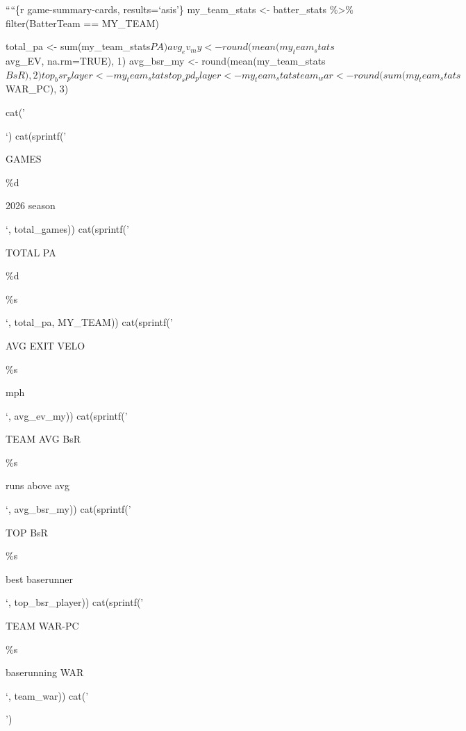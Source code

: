 \documentclass[
]{article}
\begin{document}
````\{r game-summary-cards, results=`asis'\} my\_team\_stats \textless-
batter\_stats \%\textgreater\% filter(BatterTeam == MY\_TEAM)

total\_pa \textless- sum(my\_team\_stats\(PA)
avg_ev_my      <- round(mean(my_team_stats\)avg\_EV, na.rm=TRUE), 1)
avg\_bsr\_my \textless- round(mean(my\_team\_stats\(BsR), 2)
top_bsr_player <- my_team_stats %
top_spd_player <- my_team_stats %
team_war       <- round(sum(my_team_stats\)WAR\_PC), 3)

cat('

`) cat(sprintf('

GAMES

\%d

2026 season

`, total\_games)) cat(sprintf('

TOTAL PA

\%d

\%s

`, total\_pa, MY\_TEAM)) cat(sprintf('

AVG EXIT VELO

\%s

mph

`, avg\_ev\_my)) cat(sprintf('

TEAM AVG BsR

\%s

runs above avg

`, avg\_bsr\_my)) cat(sprintf('

TOP BsR

\%s

best baserunner

`, top\_bsr\_player)) cat(sprintf('

TEAM WAR-PC

\%s

baserunning WAR

`, team\_war)) cat('

')
\end{document}
